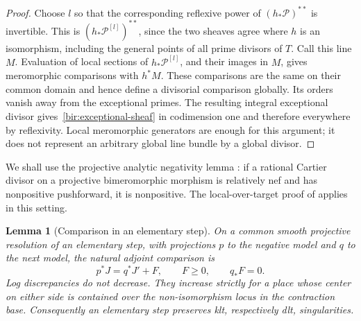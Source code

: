 \documentclass[11pt,letterpaper]{article}
\newtheorem{lemma}[theorem]{Lemma}
\theoremstyle{definition}
\theoremstyle{remark}
\begin{document}
\begin{proof}
Choose $l$ so that the corresponding reflexive power of
$(h_*\mathcal P)^{**}$ is invertible.  This is
$(h_*\mathcal P^{[l]})^{**}$, since the two sheaves agree where $h$ is an
isomorphism, including the general points of all prime divisors of
$T$.  Call this line $M$.  Evaluation of local sections of
$h_*\mathcal P^{[l]}$, and their images in $M$, gives meromorphic
comparisons with $h^*M$.  These comparisons are the same on their common
domain and hence define a divisorial comparison globally.  Its orders
vanish away from the exceptional primes.  The resulting integral
exceptional divisor gives~\eqref{bir:exceptional-sheaf} in codimension
one and therefore everywhere by reflexivity.  Local meromorphic
generators are enough for this argument; it does not represent an
arbitrary global line bundle by a global divisor.
\end{proof}

We shall use the projective analytic negativity lemma
\cite{FujinoAnalyticMMP,BirationalGeometry}: if a rational Cartier
divisor on a projective bimeromorphic morphism is relatively nef and
has nonpositive pushforward, it is nonpositive.  The local-over-target
proof of \cite[Lemma~3.39]{BirationalGeometry} applies in this setting.

\begin{lemma}[Comparison in an elementary step]
\label{bir:comparison}
On a common smooth projective resolution of an elementary step, with
projections $p$ to the negative model and $q$ to the next model, the
natural adjoint comparison is
\begin{equation}
 p^*J=q^*J'+F,\qquad F\geq0,\qquad q_*F=0.
 \label{bir:effective-comparison}
\end{equation}
Log discrepancies do not decrease.  They increase strictly for a
place whose center on either side is contained over the non-isomorphism
locus in the contraction base.  Consequently an elementary step
preserves klt, respectively dlt, singularities.
\end{lemma}
\end{document}
